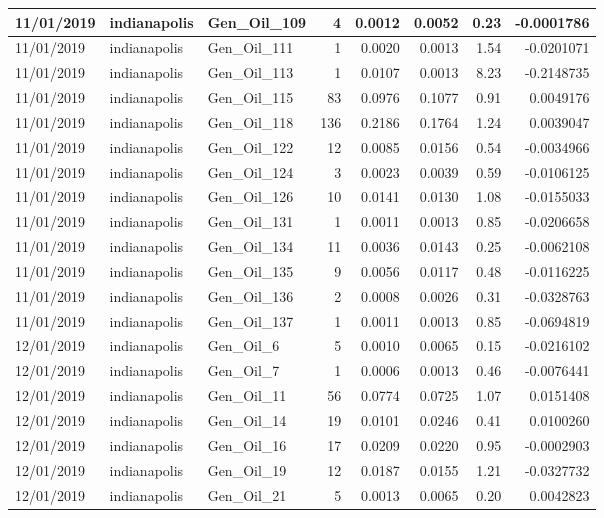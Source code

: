 \documentclass[
  letterpaper,
  DIV=11,
  numbers=noendperiod]{scrartcl}
\begin{document}
\begin{tabular}{l|l|l|r|r|r|r|r}
\hline
11/01/2019 & indianapolis & Gen\_Oil\_109 & 4 & 0.0012 & 0.0052 & 0.23 & -0.0001786\\
\hline
11/01/2019 & indianapolis & Gen\_Oil\_111 & 1 & 0.0020 & 0.0013 & 1.54 & -0.0201071\\
\hline
11/01/2019 & indianapolis & Gen\_Oil\_113 & 1 & 0.0107 & 0.0013 & 8.23 & -0.2148735\\
\hline
11/01/2019 & indianapolis & Gen\_Oil\_115 & 83 & 0.0976 & 0.1077 & 0.91 & 0.0049176\\
\hline
11/01/2019 & indianapolis & Gen\_Oil\_118 & 136 & 0.2186 & 0.1764 & 1.24 & 0.0039047\\
\hline
11/01/2019 & indianapolis & Gen\_Oil\_122 & 12 & 0.0085 & 0.0156 & 0.54 & -0.0034966\\
\hline
11/01/2019 & indianapolis & Gen\_Oil\_124 & 3 & 0.0023 & 0.0039 & 0.59 & -0.0106125\\
\hline
11/01/2019 & indianapolis & Gen\_Oil\_126 & 10 & 0.0141 & 0.0130 & 1.08 & -0.0155033\\
\hline
11/01/2019 & indianapolis & Gen\_Oil\_131 & 1 & 0.0011 & 0.0013 & 0.85 & -0.0206658\\
\hline
11/01/2019 & indianapolis & Gen\_Oil\_134 & 11 & 0.0036 & 0.0143 & 0.25 & -0.0062108\\
\hline
11/01/2019 & indianapolis & Gen\_Oil\_135 & 9 & 0.0056 & 0.0117 & 0.48 & -0.0116225\\
\hline
11/01/2019 & indianapolis & Gen\_Oil\_136 & 2 & 0.0008 & 0.0026 & 0.31 & -0.0328763\\
\hline
11/01/2019 & indianapolis & Gen\_Oil\_137 & 1 & 0.0011 & 0.0013 & 0.85 & -0.0694819\\
\hline
12/01/2019 & indianapolis & Gen\_Oil\_6 & 5 & 0.0010 & 0.0065 & 0.15 & -0.0216102\\
\hline
12/01/2019 & indianapolis & Gen\_Oil\_7 & 1 & 0.0006 & 0.0013 & 0.46 & -0.0076441\\
\hline
12/01/2019 & indianapolis & Gen\_Oil\_11 & 56 & 0.0774 & 0.0725 & 1.07 & 0.0151408\\
\hline
12/01/2019 & indianapolis & Gen\_Oil\_14 & 19 & 0.0101 & 0.0246 & 0.41 & 0.0100260\\
\hline
12/01/2019 & indianapolis & Gen\_Oil\_16 & 17 & 0.0209 & 0.0220 & 0.95 & -0.0002903\\
\hline
12/01/2019 & indianapolis & Gen\_Oil\_19 & 12 & 0.0187 & 0.0155 & 1.21 & -0.0327732\\
\hline
12/01/2019 & indianapolis & Gen\_Oil\_21 & 5 & 0.0013 & 0.0065 & 0.20 & 0.0042823\\

\end{tabular}
\end{document}
